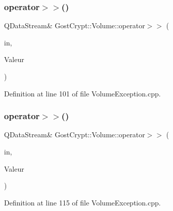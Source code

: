 \subsubsection{\texorpdfstring{operator$>$$>$()}{operator>>()}\hspace{0.1cm}{\footnotesize\ttfamily [7/19]}}
{\footnotesize\ttfamily Q\+Data\+Stream\& Gost\+Crypt\+::\+Volume\+::operator$>$$>$ (\begin{DoxyParamCaption}\item[{Q\+Data\+Stream \&}]{in,  }\item[{\hyperlink{class_gost_crypt_1_1_volume_1_1_buffer_already_freed}{Gost\+Crypt\+::\+Volume\+::\+Buffer\+Already\+Freed} \&}]{Valeur }\end{DoxyParamCaption})}



Definition at line 101 of file Volume\+Exception.\+cpp.

\mbox{\label{namespace_gost_crypt_1_1_volume_a1311c4d609ce2a9a3e96b08bf76ac1bb}} 
\subsubsection{\texorpdfstring{operator$>$$>$()}{operator>>()}\hspace{0.1cm}{\footnotesize\ttfamily [8/19]}}
{\footnotesize\ttfamily Q\+Data\+Stream\& Gost\+Crypt\+::\+Volume\+::operator$>$$>$ (\begin{DoxyParamCaption}\item[{Q\+Data\+Stream \&}]{in,  }\item[{\hyperlink{class_gost_crypt_1_1_volume_1_1_volume_not_open}{Gost\+Crypt\+::\+Volume\+::\+Volume\+Not\+Open} \&}]{Valeur }\end{DoxyParamCaption})}



Definition at line 115 of file Volume\+Exception.\+cpp.

\mbox{\label{namespace_gost_crypt_1_1_volume_a12c9aee121cd1e4ef5fd4dcb65f08eba}} 
